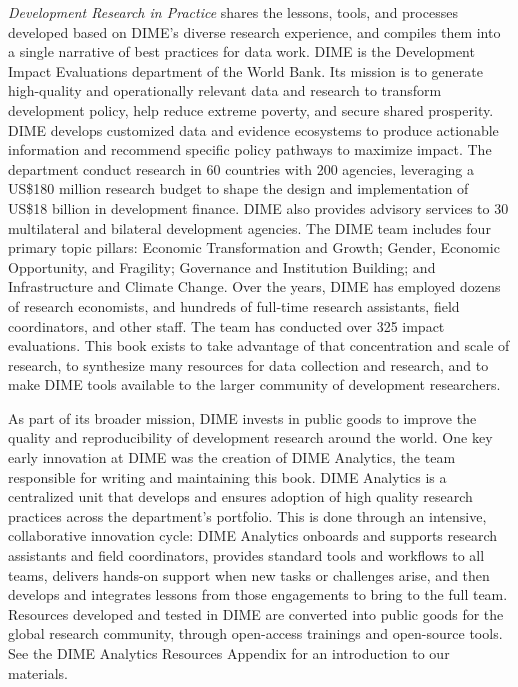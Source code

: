 \textit{Development Research in Practice} shares the lessons, tools,
and processes developed based on DIME's diverse research experience,
and compiles them into a single narrative of best practices for data work.
DIME is the Development Impact Evaluations department of the World Bank.
Its mission is to generate high-quality and operationally relevant data and research
to transform development policy, help reduce extreme poverty, and secure shared prosperity.\cite{legovini2015impact}
DIME develops customized data and evidence ecosystems to produce actionable information
and recommend specific policy pathways to maximize impact.
The department conduct research in 60 countries with 200 agencies, leveraging a
US\$180 million research budget to shape the design and implementation of
US\$18 billion in development finance.
DIME also provides advisory services to 30 multilateral and bilateral development agencies.
The DIME team includes four primary topic pillars:
Economic Transformation and Growth;
Gender, Economic Opportunity, and Fragility;
Governance and Institution Building;
and Infrastructure and Climate Change.
Over the years, DIME has employed dozens of research economists,
and hundreds of full-time research assistants, field coordinators, and other staff.
The team has conducted over 325 impact evaluations.
This book exists to take advantage of that concentration and scale of research,
to synthesize many resources for data collection and research,
and to make DIME tools available to the larger community of development researchers.

As part of its broader mission, DIME invests in public goods
to improve the quality and reproducibility of development research around the world.
One key early innovation at DIME was the creation of DIME Analytics,
the team responsible for writing and maintaining this book.
DIME Analytics is a centralized unit that develops and ensures adoption
of high quality research practices across the department's portfolio.
This is done through an intensive, collaborative innovation cycle:
DIME Analytics onboards and supports research assistants and field coordinators,
provides standard tools and workflows to all teams,
delivers hands-on support when new tasks or challenges arise,
and then develops and integrates lessons from those engagements to bring to the full team.
Resources developed and tested in DIME are converted into public goods
for the global research community, through open-access trainings and open-source tools.
See the DIME Analytics Resources Appendix for an introduction to our materials.

